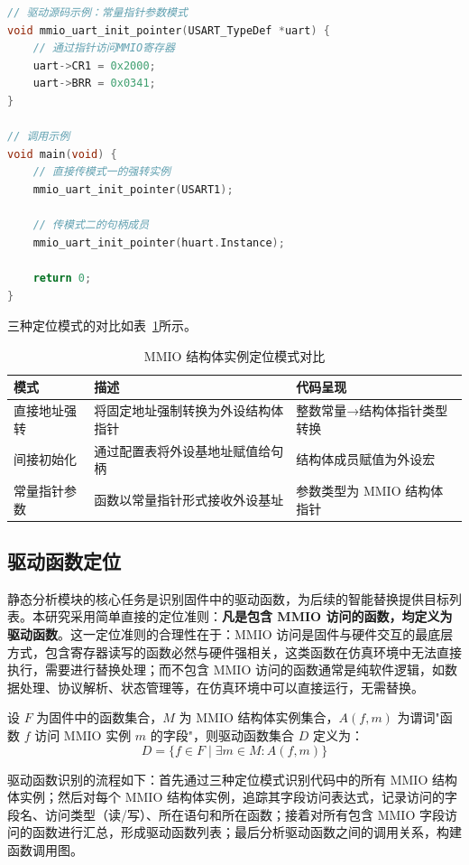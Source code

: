 \begin{lstlisting}[style=CStyle,language=C,caption=常量指针参数模式示例,label=lst:pointer-param]
// 驱动源码示例：常量指针参数模式
void mmio_uart_init_pointer(USART_TypeDef *uart) {
    // 通过指针访问MMIO寄存器
    uart->CR1 = 0x2000;
    uart->BRR = 0x0341;
}

// 调用示例
void main(void) {
    // 直接传模式一的强转实例
    mmio_uart_init_pointer(USART1);
    
    // 传模式二的句柄成员
    mmio_uart_init_pointer(huart.Instance);
    
    return 0;
}
\end{lstlisting}

三种定位模式的对比如表~\ref{tab:mmio-patterns}所示。

\begin{table}[htbp]
\centering
\caption{MMIO 结构体实例定位模式对比}
\label{tab:mmio-patterns}
\begin{tabular}{lp{5cm}l}
\toprule
\textbf{模式} & \textbf{描述} & \textbf{代码呈现} \\
\midrule
直接地址强转 & 将固定地址强制转换为外设结构体指针 & 整数常量→结构体指针类型转换 \\
间接初始化 & 通过配置表将外设基地址赋值给句柄 & 结构体成员赋值为外设宏 \\
常量指针参数 & 函数以常量指针形式接收外设基址 & 参数类型为 MMIO 结构体指针 \\
\bottomrule
\end{tabular}
\end{table}

\subsection{驱动函数定位}

静态分析模块的核心任务是识别固件中的驱动函数，为后续的智能替换提供目标列表。本研究采用简单直接的定位准则：\textbf{凡是包含 MMIO 访问的函数，均定义为驱动函数}。这一定位准则的合理性在于：MMIO 访问是固件与硬件交互的最底层方式，包含寄存器读写的函数必然与硬件强相关，这类函数在仿真环境中无法直接执行，需要进行替换处理；而不包含 MMIO 访问的函数通常是纯软件逻辑，如数据处理、协议解析、状态管理等，在仿真环境中可以直接运行，无需替换。

设 $F$ 为固件中的函数集合，$M$ 为 MMIO 结构体实例集合，$A(f, m)$ 为谓词"函数 $f$ 访问 MMIO 实例 $m$ 的字段"，则驱动函数集合 $D$ 定义为：
$$D = \{f \in F \mid \exists m \in M: A(f, m)\}$$

驱动函数识别的流程如下：首先通过三种定位模式识别代码中的所有 MMIO 结构体实例；然后对每个 MMIO 结构体实例，追踪其字段访问表达式，记录访问的字段名、访问类型（读/写）、所在语句和所在函数；接着对所有包含 MMIO 字段访问的函数进行汇总，形成驱动函数列表；最后分析驱动函数之间的调用关系，构建函数调用图。

